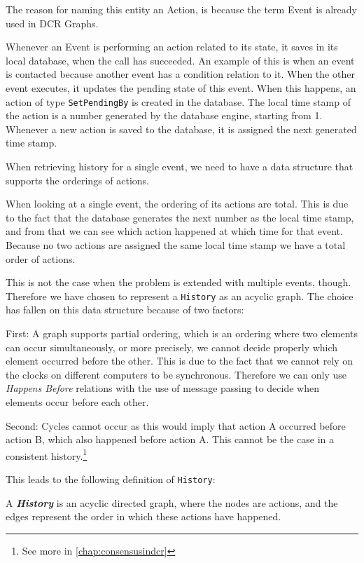 	The reason for naming this entity an Action, is because the term Event is already used in DCR Graphs.
	
	Whenever an Event is performing an action related to its state, it saves in its local database, when the call has succeeded. An example of this is when an event is contacted because another event has a condition relation to it. When the other event executes, it updates the pending state of this event. When this happens, an action of type \texttt{SetPendingBy} is created in the database. The local time stamp of the action is a number generated by the database engine, starting from 1. Whenever a new action is saved to the database, it is assigned the next generated time stamp.
	
	When retrieving history for a single event, we need to have a data structure that supports the orderings of actions.
	
	\newpar
	When looking at a single event, the ordering of its actions are total. This is due to the fact that the database generates the next number as the local time stamp, and from that we can see which action happened at which time for that event.
	Because no two actions are assigned the same local time stamp we have a total order of actions.
	
	\newpar This is not the case when the problem is extended with multiple events, though. Therefore we have chosen to represent a \texttt{History} as an acyclic graph. The choice has fallen on this data structure because of two factors:
	
	First: A graph supports partial ordering, which is an ordering where two elements can occur simultaneously, or more precisely, we cannot decide properly which element occurred before the other. This is due to the fact that we cannot rely on the clocks on different computers to be synchronous. Therefore we can only use \textit{Happens Before} relations with the use of message passing to decide when elements occur before each other.
	
	Second: Cycles cannot occur as this would imply that action A occurred before action B, which also happened before action A. This cannot be the case in a consistent history.\footnote{See more in \autoref{chap:consensusindcr}}
	
	\newpar This leads to the following definition of \texttt{History}:
	
	\newpar
	\begin{definition}
		A \textit{\textbf{History}} is an acyclic directed graph, where the nodes are actions, and the edges represent the order in which these actions have happened.
	\end{definition}
	
